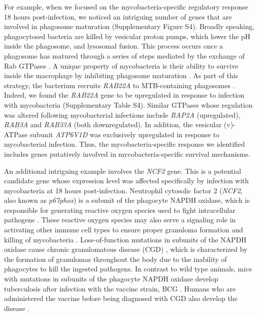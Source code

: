 For example, when we focused on the mycobacteria-specific regulatory
response 18 hours post-infection, we noticed an intriguing number of
genes that are involved in phagosome maturation (Supplementary Figure
S4). Broadly speaking, phagocytosed bacteria are killed by vesicular
proton pumps, which lower the pH inside the phagosome, and lysosomal
fusion. This process occurs once a phagosome has matured through a
series of steps mediated by the exchange of Rab GTPases \citep{Vergne2004;
@Mortellaro2009}. A unique property of mycobacteria is their ability
to survive inside the macrophage by inhibiting phagosome maturation
\citep{Hestvik2005}. As part of this strategy, the bacterium recruits
\emph{RAB22A} to MTB-containing phagosomes \citep{Roberts2006}. Indeed,
we found the \emph{RAB22A} gene to be upregulated in response to
infection with mycobacteria (Supplementary Table S4). Similar GTPases
whose regulation was altered following mycobacterial infections include
\emph{RAP2A} (upregulated), \emph{RAB3A} and \emph{RAB33A} (both
downregulated). In addition, the vesicular (v)-ATPase subunit
\emph{ATP6V1D} was exclusively upregulated in response to mycobacterial
infection. Thus, the mycobacteria-specific response we identified
includes genes putatively involved in mycobacteria-specific survival
mechanisms.

An additional intriguing example involves the \emph{NCF2} gene. This is
a potential candidate gene whose expression level was affected
specifically by infection with mycobacteria at 18 hours post-infection.
Neutrophil cytosolic factor 2 (\emph{NCF2}, also known as
\emph{p67phox}) is a subunit of the phagocyte NAPDH oxidase, which is
responsible for generating reactive oxygen species used to fight
intracellular pathogens \citep{Ehrt2001, Myers2003, Babior2004;
@Bustamante2011, Kim2011c, Deffert2014}. These reactive oxygen
species may also serve a signaling role in activating other immune cell
types to ensure proper granuloma formation and killing of mycobacteria
\citep{Deffert2014a}. Loss-of-function mutations in subunits of the NAPDH
oxidase cause chronic granulomatous disease (CGD) \citep{Deffert2014},
which is characterized by the formation of granulomas throughout the
body due to the inability of phagocytes to kill the ingested pathogens.
In contrast to wild type animals, mice with mutations in subunits of the
phagocyte NAPDH oxidase develop tuberculosis after infection with the
vaccine strain, BCG \citep{Deffert2014a}. Humans who are administered the
vaccine before being diagnosed with CGD also develop the disease
\citep{Deffert2014}.

